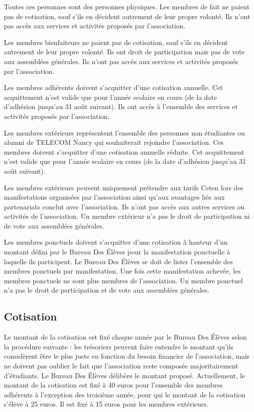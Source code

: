 \documentclass{article} %
\begin{document}
			Toutes ces personnes sont des personnes physiques. Les membres de
			fait ne paient pas de cotisation, sauf s’ils en décident autrement
			de leur propre volonté. Ils n’ont pas accès aux services et
			activités proposés par l’association.

			Les membres bienfaiteurs ne paient pas de cotisation, sauf s’ils en
			décident autrement de leur propre volonté. Ils ont droit de
			participation mais pas de vote aux assemblées générales. Ils n’ont
			pas accès aux services et activités proposés par l’association.

			Les membres adhérents doivent s’acquitter d’une cotisation annuelle.
			Cet acquittement n’est valide que pour l’année scolaire en cours
			(de la date d’adhésion jusqu’au 31 août suivant). Ils ont accès à
			l’ensemble des services et activités proposés par l’association.

			Les membres extérieurs représentent l’ensemble des personnes non
			étudiantes ou alumni de TELECOM Nancy qui souhaiterait rejoindre
			l’association. Ces membres doivent s’acquitter d’une cotisation
			annuelle réduite. Cet acquittement n’est valide que pour l’année
			scolaire en cours (de la date d’adhésion jusqu’au 31 août suivant).

			Les membres extérieurs peuvent uniquement prétendre aux tarifs Ceten
			lors des manifestations organisées par l’association ainsi qu’aux
			avantages liés aux partenariats conclut avec l’association. Ils
			n’ont pas accès aux autres services ou activités de l’association.
			Un membre extérieur n’a pas le droit de participation ni de vote aux
			assemblées générales.

			Les membres ponctuels doivent s’acquitter d’une cotisation à hauteur
			d’un montant défini par le Bureau Des Élèves pour la manifestation
			ponctuelle à laquelle ils participent. Le Bureau Des Élèves se doit
			de lister l’ensemble des membres ponctuels par manifestation. Une
			fois cette manifestation achevée, les membres ponctuels ne sont plus
			membres de l’association. Un membre ponctuel n’a pas le droit de
			participation et de vote aux assemblées générales.

		\subsection{Cotisation}

			Le montant de la cotisation est fixé chaque année par le Bureau Des
			Élèves selon la procédure suivante : les trésoriers peuvent faire
			entendre le montant qu’ils considèrent être le plus juste en
			fonction du besoin financier de l’association, mais ne doivent pas
			oublier le fait que l’association reste composée majoritairement
			d'étudiants. Le Bureau Des Élèves délibère le montant proposé.
			Actuellement, le montant de la cotisation est fixé à 40 euros pour
			l’ensemble des membres adhérents à l’exception des troisième année,
			pour qui le montant de la cotisation s’élève à 25 euros. Il est fixé
			à 15 euros pour les membres extérieurs.
\end{document}
